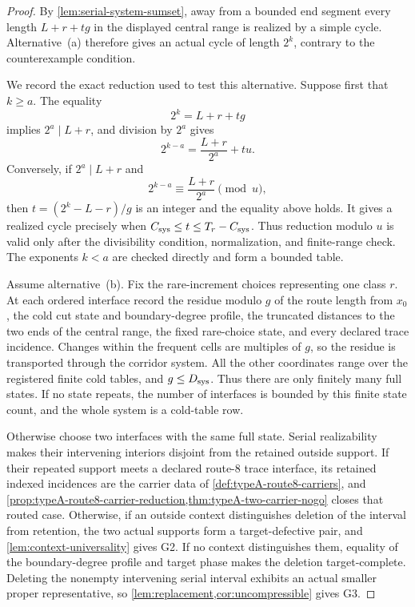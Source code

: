 \documentclass[11pt]{article}
\begin{document}
\begin{proof}
By \cref{lem:serial-system-sumset}, away from a bounded end segment every
length \(L+r+tg\) in the displayed central range is realized by a simple
cycle.  Alternative~\textup{(a)} therefore gives an actual cycle of length
\(2^k\), contrary to the counterexample condition.

We record the exact reduction used to test this alternative.  Suppose first
that \(k\ge a\).  The equality
\[
 2^k=L+r+tg
\]
implies \(2^a\mid L+r\), and division by \(2^a\) gives
\[
 2^{k-a}=\frac{L+r}{2^a}+tu.
\]
Conversely, if \(2^a\mid L+r\) and
\[
 2^{k-a}\equiv\frac{L+r}{2^a}\pmod u,
\]
then \(t=(2^k-L-r)/g\) is an integer and the equality above holds.  It gives a
realized cycle precisely when
\(C_{\rm sys}\le t\le T_r-C_{\rm sys}\).  Thus reduction modulo \(u\) is
valid only after the divisibility condition, normalization, and finite-range
check.  The exponents \(k<a\) are checked directly and form a bounded table.

Assume alternative~\textup{(b)}.  Fix the rare-increment choices representing
one class \(r\).  At each ordered interface record the residue modulo \(g\) of
the route length from \(x_0\), the cold cut state and boundary-degree profile,
the truncated distances to the two ends of the central range, the fixed
rare-choice state, and every declared trace incidence.  Changes within the
frequent cells are multiples of \(g\), so the residue is transported through
the corridor system.  All the other coordinates range over the registered
finite cold tables, and \(g\le D_{\rm sys}\).  Thus there are only finitely
many full states.  If no state repeats, the number of interfaces is bounded
by this finite state count, and the whole system is a cold-table row.

Otherwise choose two interfaces with the same full state.  Serial
realizability makes their intervening interiors disjoint from the retained
outside support.  If their repeated support meets a declared route-8 trace
interface, its retained indexed incidences are the carrier data of
\cref{def:typeA-route8-carriers}, and
\cref{prop:typeA-route8-carrier-reduction,thm:typeA-two-carrier-nogo} closes
that routed case.  Otherwise, if an outside context distinguishes deletion of
the interval from retention, the two actual supports form a target-defective
pair, and \cref{lem:context-universality} gives G2.  If no context
distinguishes them, equality of the boundary-degree profile and target phase
makes the deletion target-complete.  Deleting the nonempty intervening serial
interval exhibits an actual smaller proper representative, so
\cref{lem:replacement,cor:uncompressible} gives G3.


\end{proof}
\end{document}
